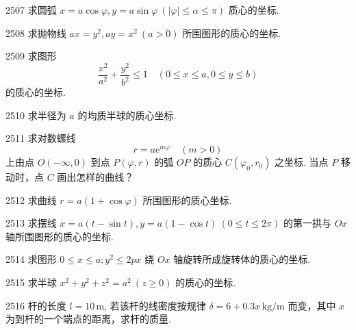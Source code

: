 \begin{prob}[M]{2507}
求圆弧 $x = a\cos\varphi, y = a\sin\varphi \ (|\varphi| \leqslant \alpha \leqslant \pi)$ 质心的坐标.
\end{prob}

\begin{prob}[M]{2508}
求抛物线 $ax = y^2, ay = x^2 \ (a > 0)$ 所围图形的质心的坐标.
\end{prob}

\begin{prob}[M]{2509}
求图形
\[
\frac{x^2}{a^2} + \frac{y^2}{b^2} \leqslant 1 \quad (0 \leqslant x \leqslant a, 0 \leqslant y \leqslant b)
\]
的质心的坐标.
\end{prob}

\begin{prob}[M]{2510}
求半径为 $a$ 的均质半球的质心坐标.
\end{prob}

\begin{prob}[M]{2511}
求对数螺线
\[
r = a\mathrm{e}^{m\varphi} \quad (m > 0)
\]
上由点 $O(-\infty, 0)$ 到点 $P(\varphi, r)$ 的弧 $OP$ 的质心 $C(\varphi_0, r_0)$ 之坐标. 当点 $P$ 移动时，点 $C$ 画出怎样的曲线？
\end{prob}

\begin{prob}[M]{2512}
求曲线 $r = a(1 + \cos\varphi)$ 所围图形的质心坐标.
\end{prob}

\begin{prob}[M]{2513}
求摆线 $x = a(t - \sin t), y = a(1 - \cos t) \ (0 \leqslant t \leqslant 2\pi)$ 的第一拱与 $Ox$ 轴所围图形的质心的坐标.
\end{prob}

\begin{prob}[M]{2514}
求图形 $0 \leqslant x \leqslant a; y^2 \leqslant 2px$ 绕 $Ox$ 轴旋转所成旋转体的质心的坐标.
\end{prob}

\begin{prob}[M]{2515}
求半球 $x^2 + y^2 + z^2 = a^2 \ (z \geqslant 0)$ 的质心的坐标.
\end{prob}



\begin{prob}[M]{2516}
杆的长度 $l = 10\,\mathrm{m}$, 若该杆的线密度按规律 $\delta = 6 + 0.3x\,\mathrm{kg/m}$ 而变，其中 $x$ 为到杆的一个端点的距离，求杆的质量.
\end{prob}

